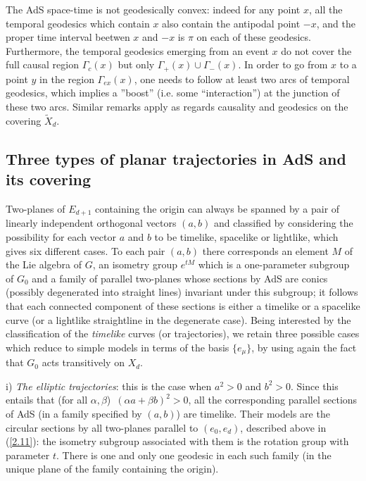 \documentclass[a4paper,a4paper]{article}
\def\wt{\widetilde}
\def\amb{E_{d+1}}
\begin{document}
The AdS space-time is not geodesically convex: indeed for any
point $x$, all the temporal geodesics which contain $x$ also
contain the antipodal point $-x$, and the proper time interval
beetwen $x$ and $-x$ is $\pi $ on each of these geodesics.
Furthermore, the temporal geodesics emerging from an event $x$ do
not cover the full causal region $\Gamma_c(x)$ but only
$\Gamma_+(x)\cup\Gamma_- (x) $. In order to go from $x$ to a
point $y$ in the region $\Gamma_{ex}(x)$, one needs to follow at
least two arcs of temporal geodesics, which implies a ''boost''
(i.e. some ``interaction'') at the junction of these two arcs.
Similar remarks apply as regards causality and geodesics on the
covering $\wt X_d$.


\subsection{Three types of planar trajectories in AdS and its covering}

Two-planes of $\amb$ containing the origin
can always be spanned by a pair of linearly independent orthogonal
vectors $(a,b)$ and classified by considering
the possibility for each vector $a$ and $b$
to be timelike, spacelike or lightlike,
which gives six different cases. To each pair $(a,b)$ there corresponds
an element $M$ of the Lie algebra of $G$,
an isometry group $e^{t M}$ which is a one-parameter subgroup of $G_0$ and
a family of parallel two-planes whose sections by AdS are conics
(possibly degenerated into straight lines)
invariant under this subgroup; it follows that each connected
component of these sections is either a timelike or a spacelike
curve (or a lightlike straightline in the degenerate case).
Being interested by the classification of the {\sl timelike} curves
(or trajectories), we retain three possible cases which
reduce to simple models in terms of the basis $\{e_{\mu}\}$,
by using again the fact that $G_0$ acts transitively on $X_d$.


\vskip 0.2cm
i) {\sl The elliptic trajectories}:
this is the case when $a^2 >0$ and $b^2 >0 $. Since
this entails that (for all $\alpha,\beta$)\
$(\alpha a + \beta b)^2 > 0$, all the corresponding
parallel sections of AdS (in a family specified by $(a,b)$)
are timelike. Their models are the circular sections by all two-planes
parallel to $(e_0,e_d)$, described above in
(\ref{2.11}): the isometry subgroup associated with them is the
rotation group with parameter $t$.
There is one and only one geodesic in each such family
(in the unique plane of the family containing the origin).
\end{document}
